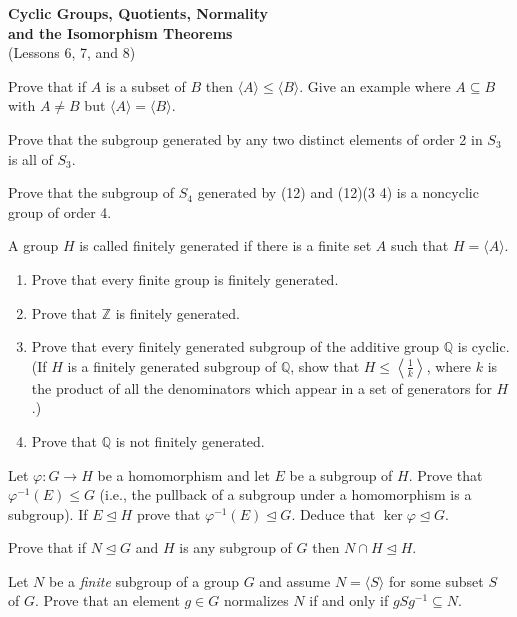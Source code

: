 \documentclass[
    11pt,a4paper,
]{exam}
\begin{document}
\def\contador{Problem Set 3}


\begin{center}
    {\bfseries\Large
        Cyclic Groups, Quotients, Normality\\ and the Isomorphism Theorems}\\
    (Lessons 6, 7, and 8)
\end{center}


\begin{questions}
\question 
Prove that if $A$ is a subset of $B$ then $\langle A\rangle \leq\langle B\rangle$. Give an example where $A \subseteq B$ with $A \neq B$ but $\langle A\rangle=\langle B\rangle$.

\question
Prove that the subgroup generated by any two distinct elements of order 2 in $S_3$ is all of $S_3$.


\question 
Prove that the subgroup of $S_4$ generated by (12) and (12)(3 4) is a noncyclic group of order 4.


\question
A group $H$ is called finitely generated if there is a finite set $A$ such that $H=\langle A\rangle$.
\begin{enumerate}[label=(\roman*)]
    \item Prove that every finite group is finitely generated.
    \item Prove that $\mathbb{Z}$ is finitely generated.
    \item Prove that every finitely generated subgroup of the additive group $\mathbb{Q}$ is cyclic. (If $H$ is a finitely generated subgroup of $\mathbb{Q}$, show that $H \leq\left\langle\frac{1}{k}\right\rangle$, where $k$ is the product of all the denominators which appear in a set of generators for $H$.)
    \item Prove that $\mathbb{Q}$ is not finitely generated.
\end{enumerate}



\question
Let $\varphi: G \rightarrow H$ be a homomorphism and let $E$ be a subgroup of $H$. Prove that $\varphi^{-1}(E) \leq G$ (i.e., the pullback of a subgroup under a homomorphism is a subgroup). If $E \unlhd H$ prove that $\varphi^{-1}(E) \unlhd G$. Deduce that $\operatorname{ker} \varphi \unlhd G$.


\question
Prove that if $N \unlhd G$ and $H$ is any subgroup of $G$ then $N \cap H \unlhd H$.

\question 
Let $N$ be a \textit{finite} subgroup of a group $G$ and assume $N = \langle S \rangle$ for some subset $S$ of $G$. Prove that an element $g \in G$ normalizes $N$ if and only if $gSg^{-1} \subseteq N$.



\end{questions}
\end{document}
